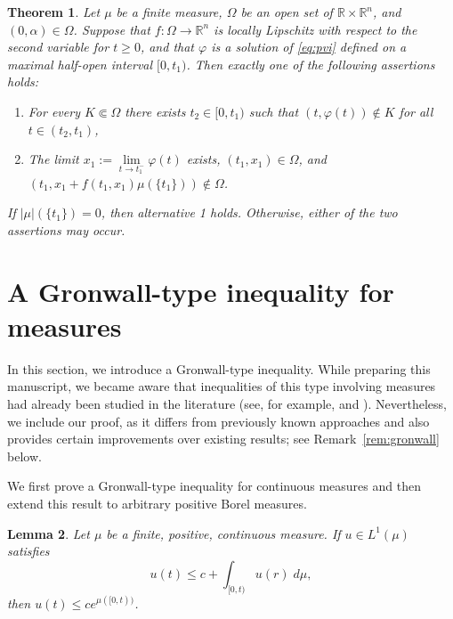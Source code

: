 \documentclass[a4paper,11pt]{amsart}
\theoremstyle{plain}
\newtheorem{thm}{Theorem}[section]
\newtheorem{lem}[thm]{Lemma}
\theoremstyle{remark}
\newcommand{\rr}{\mathbb{R}}
\numberwithin{equation}{section}
\begin{document}
\begin{thm}\label{th:prop_max} Let $\mu$ be a finite measure, $\Omega$ be an open set of $\rr\times \rr^n$, and $(0,\alpha)\in\Omega$. Suppose that $f:\Omega\to\mathbb{R}^n$ is locally Lipschitz with respect to the second variable for $t\geq 0$, and that $\varphi$ is a solution of \eqref{eq:pvi} defined on a maximal half-open interval $[0,t_1)$. Then exactly one of the following assertions holds:
\begin{enumerate}
\item For every $K\Subset \Omega$ there exists $t_2\in [0,t_1)$ such that $(t,\varphi(t))\notin K$ for all $t\in (t_2,t_1)$,
\item The limit $x_1:=\lim\limits_{t\to t_1^-}\varphi(t)$ exists, $(t_1,x_1)\in \Omega$, and $(t_1,x_1+f(t_1,x_1)\mu(\{t_1\}))\notin \Omega$.
\end{enumerate}
If $|\mu|(\{t_1\})=0$, then alternative 1 holds. Otherwise, either of the two assertions may occur.
\end{thm}

\section{A Gronwall-type inequality for measures}\label{sec:gronwall}

In this section, we introduce a Gronwall-type inequality. While preparing this manuscript, we became aware that inequalities of this type involving measures had already been studied in the literature (see, for example, \cite[Th.~5.1]{StewartN.Ethier1593} and \cite[Th.~17.4]{D.D.Bainov1594}). Nevertheless, we include our proof, as it differs from previously known approaches and also provides certain improvements over existing results; see Remark~\ref{rem:gronwall} below.


We first prove a Gronwall-type inequality for continuous measures and then extend this result to arbitrary positive Borel measures.

\begin{lem}\label{Lema gronwall}
	Let $\mu$ be a finite, positive, continuous measure. 
	If $u\in L^1(\mu)$ satisfies 
	\begin{equation}
		u(t)\leq c+\int_{[0,t)}u(r) \; d\mu, \label{eq:lema gronwall}
	\end{equation}
then $u(t)\leq ce^{\mu([0,t))}$.
\end{lem}
\end{document}
